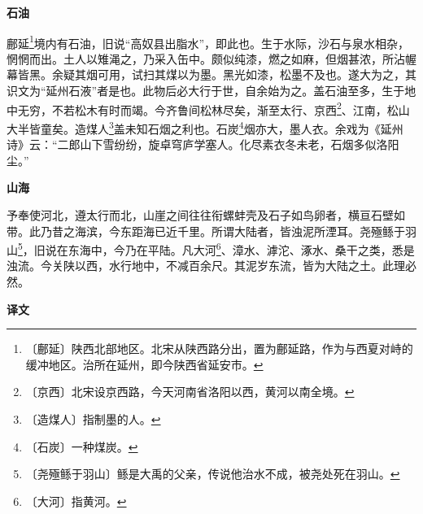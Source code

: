 \documentclass[12pt,UTF-8,openany,a4]{ctexbook}
\begin{document}
\begin{large}
    \begin{center}{\Large\textbf{石油}}\end{center}
    
    鄜延\footnote{〔鄜延〕\yiwen 陕西北部地区。北宋从陕西路分出，置为鄜延路，作为与西夏对峙的缓冲地区。治所在延州，即今陕西省延安市。}境内有石油，旧说“高奴县出脂水”，即此也。生于水际，沙石与泉水相杂，惘惘而出。土人以雉渑之，乃采入缶中。颇似纯漆，燃之如麻，但烟甚浓，所沾幄幕皆黑。余疑其烟可用，试扫其煤以为墨。黑光如漆，松墨不及也。遂大为之，其识文为“延州石液”者是也。此物后必大行于世，自余始为之。盖石油至多，生于地中无穷，不若松木有时而竭。今齐鲁间松林尽矣，渐至太行、京西\footnote{〔京西〕\yiwen 北宋设京西路，今天河南省洛阳以西，黄河以南全境。}、江南，松山大半皆童矣。造煤人\footnote{〔造煤人〕\yiwen 指制墨的人。}盖未知石烟之利也。石炭\footnote{〔石炭〕\yiwen 一种煤炭。}烟亦大，墨人衣。余戏为《延州诗》云：“二郎山下雪纷纷，旋卓穹庐学塞人。化尽素衣冬未老，石烟多似洛阳尘。”
    
    \begin{center}{\Large\textbf{山海}}\end{center}
    
    予奉使河北，遵太行而北，山崖之间往往衔螺蚌壳及石子如鸟卵者，横亘石壁如带。此乃昔之海滨，今东距海已近千里。所谓大陆者，皆浊泥所湮耳。尧殛鲧于羽山\footnote{〔尧殛鲧于羽山〕\yiwen 鲧是大禹的父亲，传说他治水不成，被尧处死在羽山。}，旧说在东海中，今乃在平陆。凡大河\footnote{〔大河〕\yiwen 指黄河。}、漳水、滹沱、涿水、桑干之类，悉是浊流。今关陕以西，水行地中，不减百余尺。其泥岁东流，皆为大陆之土。此理必然。

\end{large}


\newpage

\begin{Large}
    \noindent\textbf{译文}
\end{Large}


\vspace{1em}
\end{document}
